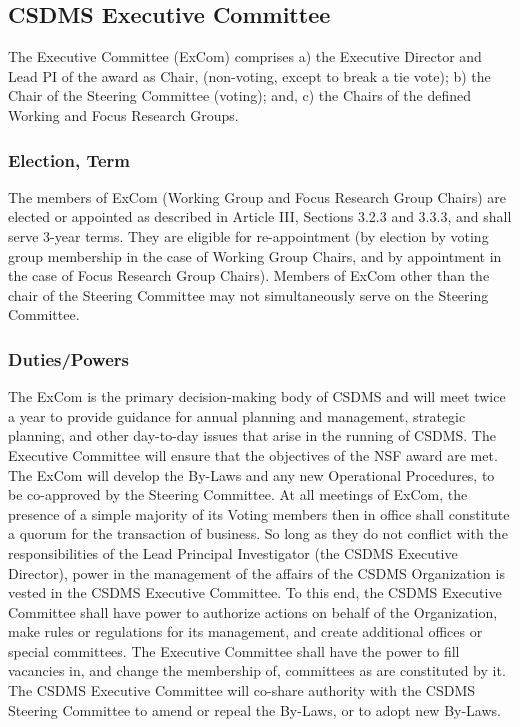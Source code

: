 \documentclass[11pt, oneside]{article}   	%
\begin{document}
\subsection{CSDMS Executive Committee}

The Executive Committee (ExCom) comprises a) the Executive Director and Lead PI of the award as Chair, (non-voting, except to break a tie vote); b) the Chair of the Steering Committee (voting); and, c) the Chairs of the defined Working and Focus Research Groups.
 
\subsubsection{	Election, Term}

The members of ExCom (Working Group and Focus Research Group Chairs) are elected or appointed as described in Article III, Sections 3.2.3 and 3.3.3, and shall serve 3-year terms.  They are eligible for re-appointment (by election by voting group membership in the case of Working Group Chairs, and by appointment in the case of Focus Research Group Chairs). Members of ExCom other than the chair of the Steering Committee may not simultaneously serve on the Steering Committee.  

\subsubsection{Duties/Powers}
	
The ExCom is the primary decision-making body of CSDMS and will meet twice a year to provide guidance for annual planning and management, strategic planning, and other day-to-day issues that arise in the running of CSDMS. The Executive Committee will ensure that the objectives of the NSF award are met. The ExCom will develop the By-Laws and any new Operational Procedures, to be co-approved by the Steering Committee. At all meetings of ExCom, the presence of a simple majority of its Voting members then in office shall constitute a quorum for the transaction of business. So long as they do not conflict with the responsibilities of the Lead Principal Investigator (the CSDMS Executive Director), power in the management of the affairs of the CSDMS Organization is vested in the CSDMS Executive Committee. To this end, the CSDMS Executive Committee shall have power to authorize actions on behalf of the Organization, make rules or regulations for its management, and create additional offices or special committees. The Executive Committee shall have the power to fill vacancies in, and change the membership of, committees as are constituted by it.  The CSDMS Executive Committee will co-share authority with the CSDMS Steering Committee to amend or repeal the By-Laws, or to adopt new By-Laws.
\end{document}
